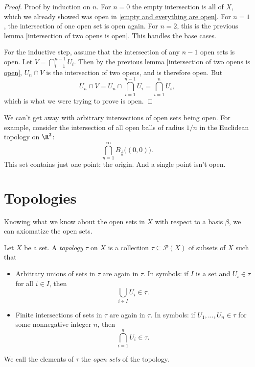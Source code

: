 \documentclass[noname]{notes}
\begin{document}
\begin{proof}
	Proof by induction on $n$. For $n = 0$ the empty intersection is all of $X$, which we already showed was open in \cref{empty and everything are open}. For $n = 1$, the intersection of one open set is open again. For $n = 2$, this is the previous lemma \cref{intersection of two opens is open}. This handles the base cases. 
	
	For the inductive step, assume that the intersection of any $n-1$ open sets is open. Let $V = \bigcap_{i=1}^{n-1} U_i$. Then by the previous lemma \cref{intersection of two opens is open}, $U_n \cap V$ is the intersection of two opens, and is therefore open. But 
	\[
		U_n \cap V = U_n \cap \bigcap_{i=1}^{n-1} U_i = \bigcap_{i=1}^n U_i,
	\]
	which is what we were trying to prove is open. 
\end{proof}

\begin{example}
	We can't get away with arbitrary intersections of open sets being open. For example, consider the intersection of all open balls of radius $1/n$ in the Euclidean topology on $\R^2$: 
	\[
		\bigcap_{n=1}^\infty B_{\frac{1}{n}}\big((0,0)\big). 
	\]
	This set contains just one point: the origin. And a single point isn't open. 
\end{example}


\section{Topologies}

Knowing what we know about the open sets in $X$ with respect to a basis $\beta$, we can axiomatize the open sets. 

\begin{definition}
	Let $X$ be a set. A \emph{topology} $\tau$ on $X$ is a collection $\tau \subseteq \mathcal{P}(X)$ of subsets of $X$ such that 
	\begin{itemize}
		\item Arbitrary unions of sets in $\tau$ are again in $\tau$. In symbols: if $I$ is a set and $U_i \in \tau$ for all $i \in I$, then 
		\[
			\bigcup_{i \in I} U_i \in \tau.
		\]
		\item Finite intersections of sets in $\tau$ are again in $\tau$. In symbols: if $U_1, \ldots, U_n \in \tau$ for some nonnegative integer $n$, then 
		\[
			\bigcap_{i=1}^n U_i \in \tau.
		\]
	\end{itemize}
	We call the elements of $\tau$ the \emph{open sets} of the topology. 
\end{definition}	
\end{document}
